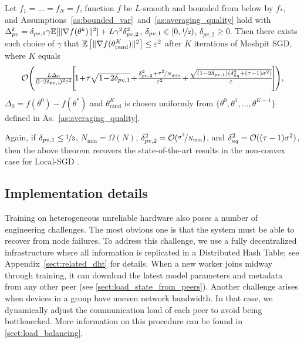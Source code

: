 \begin{theorem}\label{thm:non_cvx_convergence}
    Let $f_1 = \ldots = f_N = f$, function $f$ be $L$-smooth and bounded from below by $f_*$, and Assumptions~\ref{as:bounded_var}~and~\ref{as:averaging_quality} hold with $\Delta_{pv}^k = \delta_{pv,1}\gamma\mathbb{E}[\|\nabla f(\theta^k)\|^2] + L\gamma^2\delta_{pv,2}^2$, $\delta_{pv,1}\in [0,\nicefrac{1}{2})$, $\delta_{pv,2}\ge 0$. Then there exists such choice of $\gamma$ that $\mathbb{E}\left[\|\nabla f(\theta_{\text{rand}}^K)\|^2\right]\le \varepsilon^2$ after $K$ iterations of Moshpit SGD, where $K$ equals
    {\begin{eqnarray*}
        \cO\Bigg(\tfrac{L\Delta_0}{(\!1\!-\!2\delta_{pv,1}\!)^2\varepsilon^2}\!\Bigg[\!1\! +\!\tau\sqrt{1\!-\!2\delta_{pv,1}}\! +\! \tfrac{\delta_{pv,2}^2 + \nicefrac{\sigma^2}{N_{\min}}}{\varepsilon^2}\!+\! \tfrac{\sqrt{(1-2\delta_{pv,1})(\delta_{aq}^2+(\tau-1)\sigma^2)}}{\varepsilon}\!\Bigg]\!\Bigg),
    \end{eqnarray*}}
    $\Delta_0 = f(\theta^0) - f(\theta^*)$ and $\theta_{\text{rand}}^K$ is chosen uniformly from $\{\theta^0,\theta^1,\ldots,\theta^{K-1}\}$ defined in As.~\ref{as:averaging_quality}.
\end{theorem}
Again, if $\delta_{pv,1} \le \nicefrac{1}{3}$, $N_{\min} = \Omega(N)$, $\delta_{pv,2}^2 = {\cal O}(\nicefrac{\sigma^2}{N_{\min}})$, and $\delta_{aq}^2 = {\cal O}((\tau-1)\sigma^2)$, then the above theorem recovers the state-of-the-art results in the non-convex case for Local-SGD \cite{li2019communication,koloskova2020unified}. 

\subsection{Implementation details}
\label{sect:method_implementation_details}

Training on heterogeneous unreliable hardware also poses a number of engineering challenges. The most obvious one is that the system must be able to recover from node failures. To address this challenge, we use a fully decentralized infrastructure where all information is replicated in a Distributed Hash Table; see Appendix~\ref{sect:related_dht} for details. When a new worker joins midway through training, it can download the latest model parameters and metadata from any other peer (see \autoref{sect:load_state_from_peers}). Another challenge arises when devices in a group have uneven network bandwidth. In that case, we dynamically adjust the communication load of each peer to avoid being bottlenecked. More information on this procedure can be found in \autoref{sect:load_balancing}.







